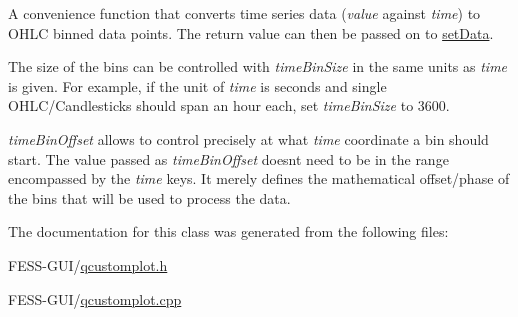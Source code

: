 A convenience function that converts time series data ({\itshape value} against {\itshape time}) to O\+H\+LC binned data points. The return value can then be passed on to \hyperlink{class_q_c_p_financial_adf12a86082f1e488df6a4e8603f8fd6d}{set\+Data}.

The size of the bins can be controlled with {\itshape time\+Bin\+Size} in the same units as {\itshape time} is given. For example, if the unit of {\itshape time} is seconds and single O\+H\+L\+C/\+Candlesticks should span an hour each, set {\itshape time\+Bin\+Size} to 3600.

{\itshape time\+Bin\+Offset} allows to control precisely at what {\itshape time} coordinate a bin should start. The value passed as {\itshape time\+Bin\+Offset} doesn\textquotesingle{}t need to be in the range encompassed by the {\itshape time} keys. It merely defines the mathematical offset/phase of the bins that will be used to process the data. 

The documentation for this class was generated from the following files\+:\begin{DoxyCompactItemize}
\item 
F\+E\+S\+S-\/\+G\+U\+I/\hyperlink{qcustomplot_8h}{qcustomplot.\+h}\item 
F\+E\+S\+S-\/\+G\+U\+I/\hyperlink{qcustomplot_8cpp}{qcustomplot.\+cpp}\end{DoxyCompactItemize}
